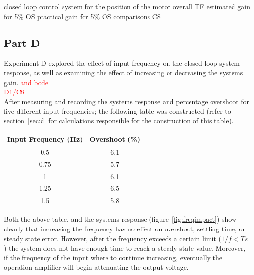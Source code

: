 \documentclass[11pt,a4paper]{article}
\begin{document}
closed loop control system for the position of the motor
overall TF
estimated gain for 5\% OS
practical gain for 5\% OS
comparisons
C8








\pagebreak
\subsection{Part D}
Experiment D explored the effect of input frequency on the closed loop system response, as well as examining the effect of increasing or decreasing the systems gain. \textcolor{red}{and bode}\\
  
\textcolor{red}{D1/C8} \\

After measuring and recording the systems response and percentage overshoot for five different input frequencies; the following table was constructed (refer to section~\ref{sec:d} for calculations responsible for the construction of this table). 

\begin{center}
    \begin{tabular}{| c | c |}
    \hline
    Input Frequency (Hz)  & Overshoot (\%)  \\ \hline
    0.5  	                  & 6.1  		\\ \hline
	0.75  	                  & 5.7  		\\ \hline
	1		                  & 6.1 		\\ \hline
	1.25	                  & 6.5 		\\ \hline
	1.5		                  & 5.8 		\\
    \hline
    \end{tabular}
\end{center}
 
Both the above table, and the systems response (figure~\ref{fig:freqimpact}) show clearly that increasing the frequency has no effect on overshoot, settling time, or steady state error. However, after the frequency exceeds a certain limit (\textbf{$1/f < Ts$}) the system does not have enough time to reach a steady state value. Moreover, if the frequency of the input where to continue increasing, eventually the operation amplifier will begin attenuating the output voltage. 
\end{document}
